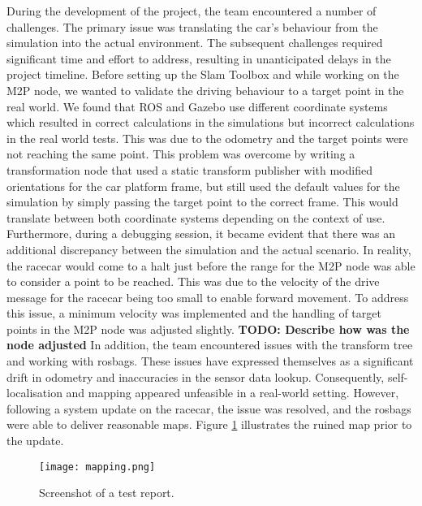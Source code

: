 During the development of the project, the team encountered a number of challenges. The primary issue was translating the car's behaviour from the simulation into the actual environment. The subsequent challenges required significant time and effort to address, resulting in unanticipated delays in the project timeline.
\newline
Before setting up the Slam Toolbox and while working on the M2P node, we wanted to validate the driving behaviour to a target point in the real world. We found that ROS and Gazebo use different coordinate systems which resulted in correct calculations in the simulations but incorrect calculations in the real world tests. This was due to the odometry and the target points were not reaching the same point. This problem was overcome by writing a transformation node that used a static transform publisher with modified orientations for the car platform frame, but still used the default values for the simulation by simply passing the target point to the correct frame. This would translate between both coordinate systems depending on the context of use.\\
Furthermore, during a debugging session, it became evident that there was an additional discrepancy between the simulation and the actual scenario. In reality, the racecar would come to a halt just before the range for the M2P node was able to consider a point to be reached. This was due to the velocity of the drive message for the racecar being too small to enable forward movement. To address this issue, a minimum velocity was implemented and the handling of target points in the M2P node was adjusted slightly. \textbf{TODO: Describe how was the node adjusted}
\newline
In addition, the team encountered issues with the transform tree and working with rosbags. These issues have expressed themselves as a significant drift in odometry and inaccuracies in the sensor data lookup. Consequently, self-localisation and mapping appeared unfeasible in a real-world setting. However, following a system update on the racecar, the issue was resolved, and the rosbags were able to deliver reasonable maps. Figure \ref{fig:map} illustrates the ruined map prior to the update.

\begin{figure}[htp]
	\vskip 0.2in
	\begin{center}
		\centerline{\texttt{[image: mapping.png]}}
		\caption{Screenshot of a test report.}
		\label{fig:map}
	\end{center}
	\vskip -0.2in
\end{figure}
